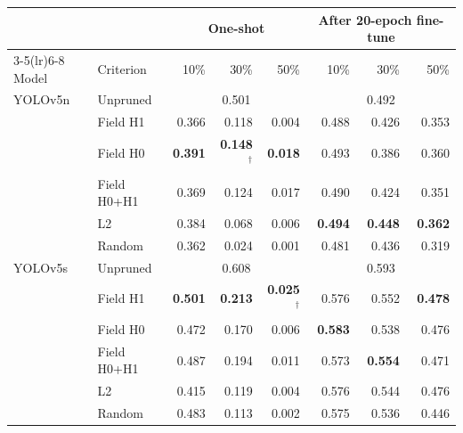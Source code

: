 \begin{tabular}{llrrrrrr}
\toprule
 & & \multicolumn{3}{c}{One-shot} & \multicolumn{3}{c}{After 20-epoch fine-tune} \\
\cmidrule(lr){3-5}\cmidrule(lr){6-8}
Model & Criterion & 10\% & 30\% & 50\% & 10\% & 30\% & 50\% \\
\midrule
YOLOv5n & Unpruned & \multicolumn{3}{c}{0.501} & \multicolumn{3}{c}{0.492} \\
 & Field H1 & 0.366 & 0.118 & 0.004 & 0.488 & 0.426 & 0.353 \\
 & Field H0 & \textbf{0.391} & \textbf{0.148}$^\dagger$ & \textbf{0.018} & 0.493 & 0.386 & 0.360 \\
 & Field H0+H1 & 0.369 & 0.124 & 0.017 & 0.490 & 0.424 & 0.351 \\
 & L2 & 0.384 & 0.068 & 0.006 & \textbf{0.494} & \textbf{0.448} & \textbf{0.362} \\
 & Random & 0.362 & 0.024 & 0.001 & 0.481 & 0.436 & 0.319 \\
\midrule
YOLOv5s & Unpruned & \multicolumn{3}{c}{0.608} & \multicolumn{3}{c}{0.593} \\
 & Field H1 & \textbf{0.501} & \textbf{0.213} & \textbf{0.025}$^\dagger$ & 0.576 & 0.552 & \textbf{0.478} \\
 & Field H0 & 0.472 & 0.170 & 0.006 & \textbf{0.583} & 0.538 & 0.476 \\
 & Field H0+H1 & 0.487 & 0.194 & 0.011 & 0.573 & \textbf{0.554} & 0.471 \\
 & L2 & 0.415 & 0.119 & 0.004 & 0.576 & 0.544 & 0.476 \\
 & Random & 0.483 & 0.113 & 0.002 & 0.575 & 0.536 & 0.446 \\
\bottomrule
\end{tabular}
